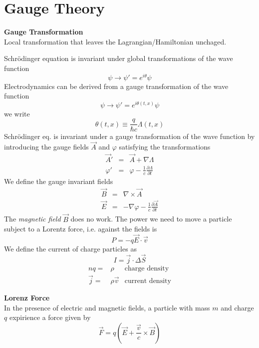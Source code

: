 \documentclass[12pt,a4paper]{article}
\author{José Antonio}
\begin{document}
\section{Gauge Theory}
\textbf{Gauge Transformation}\\
Local transformation that leaves the Lagrangian/Hamiltonian unchaged.


Schrödinger equation is invariant under global transformations of the wave function
\begin{equation}
	\psi \rightarrow \psi'=e^{i\theta}\psi
\end{equation}
Electrodynamics can be derived from a gauge transformation of the wave function
\begin{equation}
	\psi \rightarrow \psi'=e^{i\theta(t,x)}\psi
\end{equation}
we write
\begin{equation}
	\theta(t,x) \equiv \frac{q}{\hbar c}\Lambda(t,x)
\end{equation}
Schrödinger eq. is invariant under a gauge transformation of the wave function by introducing the gauge fields $\vec{A}$ and $\varphi$ satisfying the transformations
\begin{eqnarray}
	\vec{A}' & = & \vec{A} + \nabla \Lambda \\
	\varphi' & = & \varphi - \frac{1}{c}\frac{\partial \Lambda}{\partial t}
\end{eqnarray}
We define the gauge invariant fields
\begin{eqnarray}
	\vec{B} & = & \nabla \times \vec{A} \\
	\vec{E} & = & - \nabla \varphi  - \frac{1}{c}\frac{\partial \vec{A}}{\partial t}
\end{eqnarray}
The \textit{magnetic field} $\vec{B}$ does no work. The power we need to move a particle subject to a Lorentz force, i.e. against the fields is
\begin{equation}
	P = -q\vec{E}\cdot \vec{v}
\end{equation}
We define the current of charge particles as
\begin{equation}
	I = \vec{j}\cdot \Delta \vec{S}
\end{equation}
\begin{eqnarray}
	 nq  = & \rho &  \text{charge density}\\\vec{j}  = & \rho \vec{v}  &  \text{current density}
\end{eqnarray}


\textbf{Lorenz Force}\\
In the presence of electric and magnetic fields, a particle with mass $m$ and charge $q$ expirience a force given by
\begin{equation}
	\vec{F} = q(\vec{E} + \frac{\vec{v}}{c}\times \vec{B})
\end{equation}
\end{document}
